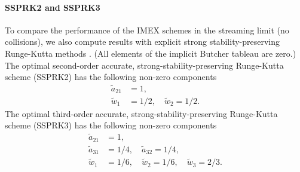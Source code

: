 \paragraph{SSPRK2 and SSPRK3}

To compare the performance of the IMEX schemes in the streaming limit (no collisions), we also compute results with explicit strong stability-preserving Runge-Kutta methods \cite{gottlieb_etal_2001}.  
(All elements of the implicit Butcher tableau are zero.)  
The optimal second-order accurate, strong-stability-preserving Runge-Kutta scheme (SSPRK2) has the following non-zero components
\begin{align}
  \tilde{a}_{21} &= 1, \nonumber \\ 
  \tilde{w}_{1}  &= 1/2, \quad \tilde{w}_{2} = 1/2. \nonumber 
\end{align}
The optimal third-order accurate, strong-stability-preserving Runge-Kutta scheme (SSPRK3) has the following non-zero components
\begin{align}
  \tilde{a}_{21} &= 1, \nonumber \\
  \tilde{a}_{31} &= 1/4, \quad \tilde{a}_{32} = 1/4, \nonumber \\
  \tilde{w}_{1} &= 1/6, \quad \tilde{w}_{2} = 1/6, \quad \tilde{w}_{3} =2/3. \nonumber
\end{align}